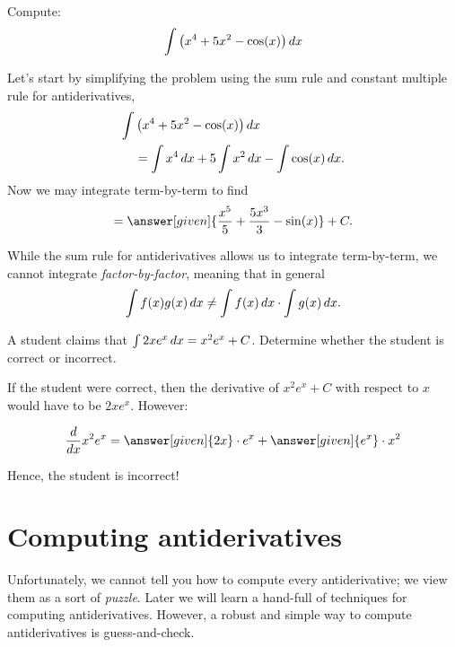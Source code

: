 \documentclass{ximera}
\begin{document}
\begin{example}
Compute:
\[
\int \left(x^4 + 5x^2 - \cos(x)\right) \mathop{}\!d x
\]
\begin{explanation}
Let's start by simplifying the problem using the sum rule
 and constant multiple rule for antiderivatives,
\begin{align*}
\int &\left(x^4 + 5x^2 - \cos(x)\right) \mathop{}\!d x\\
&= \int x^4 \mathop{}\!d x + 5\int x^2 \mathop{}\!d x - \int \cos(x) \mathop{}\!d x.
\end{align*}
Now we may integrate term-by-term to find
\[
= \answer[given]{\frac{x^5}{5} + \frac{5x^3}{3}  - \sin(x)}+C.
\]
\end{explanation}
\end{example}


\begin{warning}
While the sum rule for antiderivatives allows us to integrate
term-by-term, we cannot integrate \textit{factor-by-factor}, meaning
that in general
\[
\int f(x)g(x) \mathop{}\!d x \ne \int f(x) \mathop{}\!d x\cdot \int g(x) \mathop{}\!d x.
\]
\end{warning}


\begin{example}
  A student claims that $\int 2x e^x \mathop{}\!d x = x^2 e^x +C$.  Determine whether the student is correct or incorrect.

  \begin{explanation}
    If the student were correct, then the derivative of $x^2 e^x +C$ with respect to $x$ would have to be $2x e^x$.  However:

      \[\ddx x^2 e^x = \answer[given]{2x}\cdot e^x + \answer[given]{e^x}\cdot x^2 \]

 Hence, the student is incorrect!
  \end{explanation}
\end{example}






\section{Computing antiderivatives}


Unfortunately, we cannot tell you how to compute every antiderivative;
we view them as a sort of \textit{puzzle}. Later we will learn a
hand-full of techniques for computing antiderivatives. However, a
robust and simple way to compute antiderivatives is guess-and-check.


\end{document}
